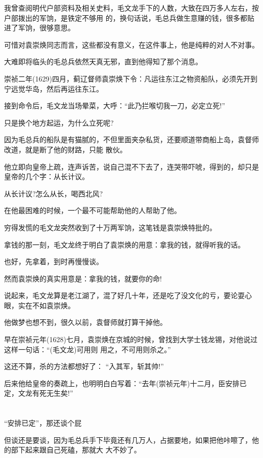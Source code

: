 \documentclass[11pt,a4paper,onecolumn]{article}
\begin{document}
我曾查阅明代户部资料及相关史料，毛文龙手下的人数，大致在四万多人左右，按户部拨出的军饷，是铁定不够用
的，换句话说，毛总兵做生意赚的钱，很多都贴进了军饷，很够意思。

可惜对袁崇焕同志而言，这些都没有意义，在这件事上，他是纯粹的对人不对事。

大难即将临头的毛总兵依然天真无邪，直到他得知了那个消息。

崇祯二年(1629)四月，蓟辽督师袁崇焕下令：凡运往东江之物资船队，必须先开到宁远觉华岛，然后再运往东江。

接到命令后，毛文龙当场晕菜，大呼：``此乃拦喉切我一刀，必定立死!''

只是换个地方起运，为什么立死呢?

因为毛总兵的船队是有猫腻的，不但里面夹杂私货，还要顺道带商船上岛，袁督师改道，就是断了他的财路，只能
散伙。

他立即向皇帝上疏，连声诉苦，说自己混不下去了，连哭带吓唬，得到的，却只是皇帝的几个字：从长计议。

从长计议?怎么从长，喝西北风?

在他最困难的时候，一个最不可能帮助他的人帮助了他。

穷得发慌的毛文龙突然收到了十万两军饷，这笔钱是袁崇焕特批的。

拿钱的那一刻，毛文龙终于明白了袁崇焕的用意：拿我的钱，就得听我的话。

也好，先拿着，到时再慢慢谈。

然而袁崇焕的真实用意是：拿我的钱，就要你的命!

说起来，毛文龙算是老江湖了，混了好几十年，还是吃了没文化的亏，要论耍心眼，实在不如袁崇焕。

他做梦也想不到，很久以前，袁督师就打算干掉他。

早在崇祯元年(1628)七月，袁崇焕在京城的时候，曾找到大学士钱龙锡，对他说过这样一句话：``(毛文龙)可用则
用之，不可用则杀之。''

这还不算，杀的方法都想好了： ``入其军，斩其帅!''

后来他给皇帝的奏疏上，也明明白白写着：``去年(崇祯元年)十二月，臣安排已定，文龙有死无生矣!''

\section[\thesection]{}

``安排已定''，那还谈个屁

但谈还是要谈，因为毛总兵手下毕竟还有几万人，占据要地，如果把他咔嚓了，他的部下起来跟自己死磕，那就大
大不妙了。
\end{document}
